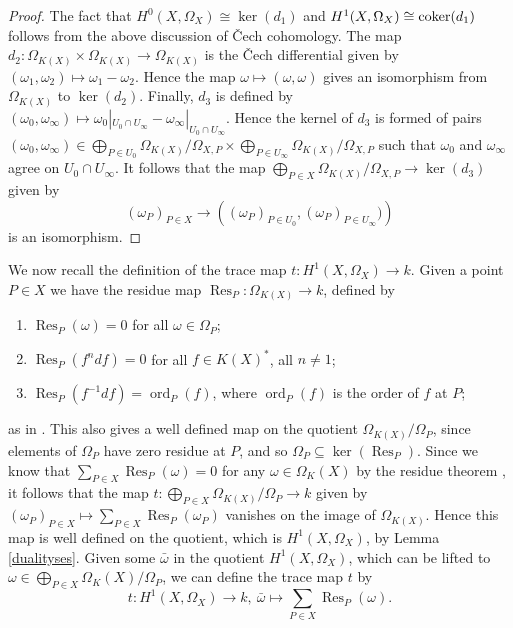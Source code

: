 \documentclass[draft, 11pt]{article} %
\theoremstyle{plain}
\theoremstyle{remark}
\newcommand{\ra}{\rightarrow}
\newcommand{\cech}{\v{C}ech }
\DeclareMathOperator{\res}{Res}
\DeclareMathOperator{\ord}{ord}
\begin{document}
\begin{proof}
The fact that $H^0(X,\Omega_X) \cong \ker(d_1)$ and $H^1(X,\Omega_X) \cong {\rm coker}(d_1)$ follows from the above discussion of \cech cohomology.
The map $d_2\colon \Omega_{K(X)} \times \Omega_{K(X)} \ra \Omega_{K(X)}$ is the \cech differential given by $(\omega_1,\omega_2) \mapsto \omega_1 - \omega_2$.
Hence the map $\omega \mapsto (\omega, \omega)$ gives an isomorphism from $\Omega_{K(X)}$ to $\ker(d_2)$.
Finally, $d_3$ is defined by $(\omega_0, \omega_\infty) \mapsto \omega_0|_{U_0 \cap U_\infty} - \omega_\infty|_{U_0 \cap U_\infty}$.
Hence the kernel of $d_3$ is formed of pairs $(\omega_0, \omega_\infty) \in \bigoplus_{P \in U_0} \Omega_{K(X)}/\Omega_{X,P} \times \bigoplus_{P \in  U_\infty} \Omega_{K(X)}/\Omega_{X,P}$ such that $\omega_0$ and $\omega_\infty$ agree on $U_0 \cap U_\infty$.
It follows that the map $\bigoplus_{P \in X} \Omega_{K(X)}/\Omega_{X,P}\ra\ker(d_3)  $ given by 
\begin{equation*}
(\omega_P)_{P \in X} \to \left( (\omega_P)_{ P \in U_0}, (\omega_P)_{P \in U_\infty}) \right)
\end{equation*}
is an isomorphism.
\end{proof}


We now recall the definition of the trace map $t\colon H^1(X,\Omega_X) \ra k$.
Given a point $P\in X$ we have the residue map $\res_P \colon \Omega_{K(X)} \ra k$, defined by 
\begin{enumerate}
\item $\res_P(\omega) = 0$ for all $\omega \in \Omega_P$;
\item $\res_P(f^ndf)=0$ for all $f \in K(X)^*$, all $n \neq 1$;
\item $\res_P(f^{-1}df) = \ord_P(f)$, where $\ord_P(f)$ is the order of $f$ at $P$;
\end{enumerate}
as in \cite[Chap III, Thm. 7.14.1]{hart}.
This also gives a well defined map on the quotient $\Omega_{K(X)}/\Omega_P$, since elements of $\Omega_P$ have zero residue at $P$, and so $\Omega_P \subseteq \ker \left(\res_P\right)$.
Since we know that $\sum_{P\in X}\res_P(\omega) = 0$ for any $\omega \in \Omega_K(X)$ by the residue theorem \cite[Chap. III, Thm. 7.14.2]{hart},  it follows that the map $t \colon \bigoplus_{P \in X} \Omega_{K(X)}/\Omega_P \ra k$ given by $(\omega_P)_{P \in X} \mapsto \sum_{P\in X} \res_P(\omega_P)$ vanishes on the image of $\Omega_{K(X)}$.
Hence this map is well defined on the quotient, which is $H^1(X,\Omega_X)$, by Lemma \ref{dualityses}.
Given some $\bar \omega$ in the quotient $H^1(X,\Omega_X)$, which can be lifted to $\omega \in \bigoplus_{P \in X} \Omega_K(X)/\Omega_P$, we can define the trace map $t$ by
\[
t \colon H^1\left(X, \Omega_X\right) \ra k,\ \bar \omega \mapsto \sum_{P \in X} \res_P(\omega).
\]
\end{document}
